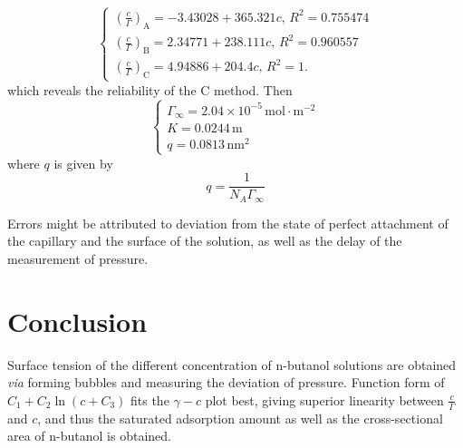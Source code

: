 \documentclass[%
 reprint,
 amsmath,amssymb,
 aps,
10.5pt,
]{revtex4-1}
\begin{document}
\begin{equation*}
\begin{cases}
\left(\frac{c}{\Gamma}\right)_\text{A} = -3.43028 + 365.321 c ,\, R^2 = 0.755474\\
\left(\frac{c}{\Gamma}\right)_\text{B} = 2.34771 + 238.111 c ,\, R^2 =0.960557\\
\left(\frac{c}{\Gamma}\right)_\text{C} =  4.94886 + 204.4 c,\, R^2 =1.
\end{cases}
\end{equation*}
which reveals the reliability of the C method. Then
\begin{equation}
\begin{cases}
	\Gamma_\infty = 2.04 \times 10^{-5} \, \mathrm{mol \cdot m^{-2}}\\
	K = 0.0244 \,\mathrm{m} \\
	q = 0.0813 \,\mathrm{nm^2}
\end{cases}
\end{equation}
where $q$ is given by
\begin{equation}
q= \frac{1}{N_A \Gamma_\infty}
\end{equation}

Errors might be attributed to deviation from the state of perfect attachment of the capillary and the surface of the solution, as well as the delay of the measurement of pressure.

\section{Conclusion}
Surface tension of the different concentration of n-butanol solutions are obtained \emph{via} forming bubbles and measuring the deviation of pressure. Function form of $C_1+C_2\ln{(c + C_3)}$ fits the $\gamma-c$ plot best, giving superior linearity between $\frac{c}{\Gamma}$ and $c$, and thus the saturated adsorption amount as well as the cross-sectional area of n-butanol is obtained. 


\end{document}
